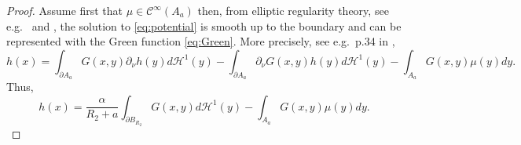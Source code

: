 \documentclass[12pt,reqno]{amsart}
\def\C{{\mathcal C}}
\def \p {\partial}
\numberwithin{equation}{section}
\begin{document}
\begin{proof}
Assume first that \(\mu \in \C^\infty(A_a)\) then, from elliptic regularity theory, see e.g.\ \cite[Theorem 6.19]{Gilbarg_Trudinger_2001} and \cite{Nardi_2014}, the solution to \eqref{eq:potential} is smooth up to the boundary and can be represented with the Green function \eqref{eq:Green}. More precisely, see e.g.\ p.34 in \cite{Evans_2010},
\begin{equation*}
h(x)=\int_{\p A_a} G(x,y) \p_\nu h(y) d\mathcal{H}^1(y)-\int_{\p A_a} \p_\nu G(x,y) h(y) d\mathcal{H}^1(y) -\int_{A_a} G(x,y) \mu(y) dy.
\end{equation*}
Thus,
\begin{equation}\label{eq:representation_h}
h(x)= \frac{\alpha}{R_2+a}\int_{\p B_{R_2}} G(x,y) d\mathcal{H}^1(y)-\int_{A_a} G(x,y) \mu(y) d y.
\end{equation}


\end{proof}
\end{document}
